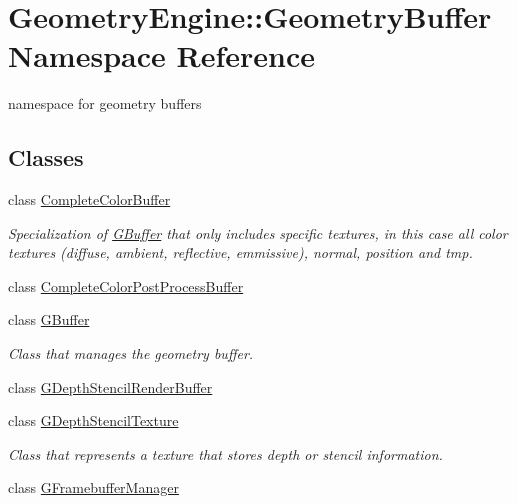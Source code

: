 \hypertarget{namespace_geometry_engine_1_1_geometry_buffer}{}\section{Geometry\+Engine\+::Geometry\+Buffer Namespace Reference}
\label{namespace_geometry_engine_1_1_geometry_buffer}


namespace for geometry buffers  


\subsection*{Classes}
\begin{DoxyCompactItemize}
\item 
class \mbox{\hyperlink{class_geometry_engine_1_1_geometry_buffer_1_1_complete_color_buffer}{Complete\+Color\+Buffer}}
\begin{DoxyCompactList}\small\item\em Specialization of \mbox{\hyperlink{class_geometry_engine_1_1_geometry_buffer_1_1_g_buffer}{G\+Buffer}} that only includes specific textures, in this case all color textures (diffuse, ambient, reflective, emmissive), normal, position and tmp. \end{DoxyCompactList}\item 
class \mbox{\hyperlink{class_geometry_engine_1_1_geometry_buffer_1_1_complete_color_post_process_buffer}{Complete\+Color\+Post\+Process\+Buffer}}
\item 
class \mbox{\hyperlink{class_geometry_engine_1_1_geometry_buffer_1_1_g_buffer}{G\+Buffer}}
\begin{DoxyCompactList}\small\item\em Class that manages the geometry buffer. \end{DoxyCompactList}\item 
class \mbox{\hyperlink{class_geometry_engine_1_1_geometry_buffer_1_1_g_depth_stencil_render_buffer}{G\+Depth\+Stencil\+Render\+Buffer}}
\item 
class \mbox{\hyperlink{class_geometry_engine_1_1_geometry_buffer_1_1_g_depth_stencil_texture}{G\+Depth\+Stencil\+Texture}}
\begin{DoxyCompactList}\small\item\em Class that represents a texture that stores depth or stencil information. \end{DoxyCompactList}\item 
class \mbox{\hyperlink{class_geometry_engine_1_1_geometry_buffer_1_1_g_framebuffer_manager}{G\+Framebuffer\+Manager}}

\end{DoxyCompactItemize}
